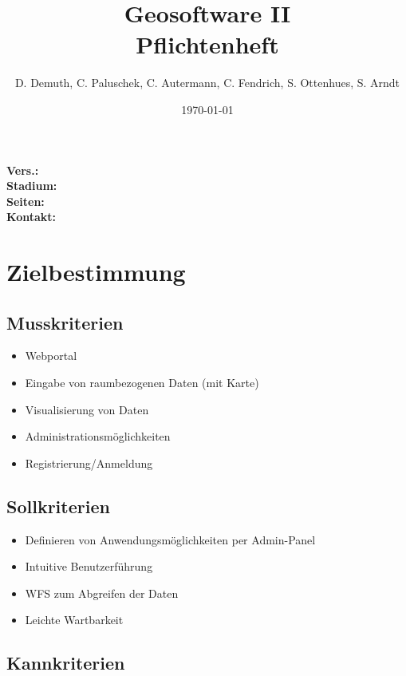 \documentclass[a4paper,11pt]{article}             %
\begin{document}
\title{Geosoftware II \\ \small Pflichtenheft}
\author{D. Demuth, C. Paluschek, C. Autermann, C. Fendrich, S. Ottenhues, S. Arndt}
\date{\today}
\maketitle
\thispagestyle{empty}

\begin{center}
\bf Vers.: \MyVersion \\
\bf Stadium: \MyStatus\\
\bf Seiten: \thelastpage \\
\bf Kontakt: \email \\
\end{center}
\newpage

\tableofcontents

\newpage

\section{Zielbestimmung}
	\subsection{Musskriterien}
		\begin{itemize}
			\item Webportal
			\item Eingabe von raumbezogenen Daten (mit Karte)
			\item Visualisierung von Daten
			\item Administrationsmöglichkeiten
			\item Registrierung/Anmeldung
		\end{itemize}
	\subsection{Sollkriterien}
		\begin{itemize}
			\item Definieren von Anwendungsmöglichkeiten per Admin-Panel
			\item Intuitive Benutzerführung
			\item WFS zum Abgreifen der Daten
			\item Leichte Wartbarkeit
		\end{itemize}
	\subsection{Kannkriterien}
\end{document}
